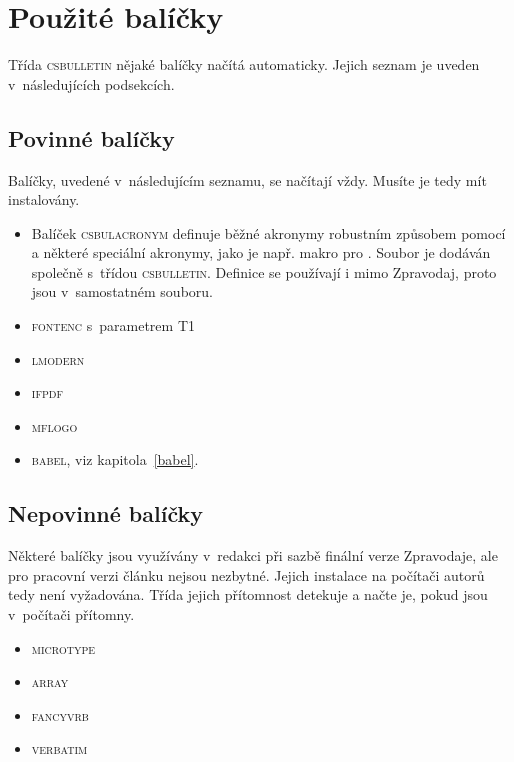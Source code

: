\documentclass{csbulletin}
\let\pkg\textsc
\begin{document}
\section{Použité balíčky}
Třída \pkg{csbulletin} nějaké balíčky načítá automaticky. Jejich seznam je uveden v~následujících
podsekcích.

\subsection{Povinné balíčky}
Balíčky, uvedené v~následujícím seznamu, se načítají vždy. Musíte je tedy mít instalovány.

\begin{itemize}
\item Balíček \pkg{csbulacronym} definuje běžné akronymy robustním způsobem pomocí  a
některé speciální akronymy, jako je např. makro  pro \cstug. Soubor je dodáván společně s~třídou
\pkg{csbulletin}. Definice se používají i mimo Zpravodaj, proto jsou v~samostatném souboru.

\item \pkg{fontenc} s~parametrem T1

\item \pkg{lmodern}

\item \pkg{ifpdf}

\item \pkg{mflogo}

\item \pkg{babel}, viz kapitola~\ref{babel}.
\end{itemize}

\subsection{Nepovinné balíčky}
Některé balíčky jsou využívány v~redakci při sazbě finální verze Zpravodaje, ale pro pracovní verzi
článku nejsou nezbytné. Jejich instalace na počítači autorů tedy není vyžadována. Třída jejich
přítomnost detekuje a načte je, pokud jsou v~počítači přítomny.

\begin{itemize}
\item \pkg{microtype}

\item \pkg{array}

\item \pkg{fancyvrb}

\item \pkg{verbatim}
\end{itemize}
\end{document}
